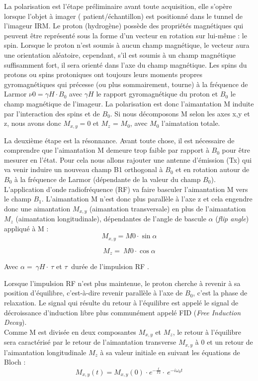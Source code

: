 La polarisation est l’étape préliminaire avant toute acquisition, elle s’opère lorsque l’objet à imager ( patient/échantillon) est positionné dans le tunnel de l’imageur IRM. Le proton (hydrogène) possède des propriétés magnétiques qui peuvent être représenté sous la forme d’un vecteur en rotation sur lui-même : le spin. Lorsque le proton n’est soumis à aucun champ magnétique, le vecteur aura une orientation aléatoire, cependant, s’il est soumis à un champ magnétique suffisamment fort, il sera orienté dans l’axe du champ magnétique. Les spins du protons ou spins protoniques ont toujours leurs moments propres gyromagnétiques qui précesse (ou plus sommairement, tourne) à la fréquence de Larmor $\nu 0 =\gamma H \cdot B_0 $ avec $\gamma H$ le rapport gyromagnétique du proton et $B_0$ le champ magnétique de l’imageur. La polarisation est donc l’aimantation M induite par l’interaction des spins et de $B_0$. Si nous décomposons M selon les axes x,y et z, nous avons donc $M_{x,y} = 0$ et $M_z$ = $M_0$, avec $M_0$ l’aimatation totale.

La deuxième étape est la résonnance. Avant toute chose, il est nécessaire de comprendre que l’aimantation M demeure trop faible  par rapport à $B_0$ pour être mesurer en l’état. Pour cela nous allons rajouter une antenne d’émission (Tx) qui va venir induire un nouveau champ B1 orthogonal à $B_0$ et en rotation autour de $B_0$ à la fréquence de Larmor (dépendante de la valeur du champ $B_0$).  L’application d’onde radiofréquence (RF) va faire basculer l’aimantation M vers le champ $B_1$. L’aimantation M n’est donc plus parallèle à l’axe z et cela engendre donc une aimantation $M_{x,y}$ (aimantation transversale) en plus de l’aimantation $M_z$ (aimantation longitudinale), dépendantes de l’angle de bascule $\alpha$ (\textit{flip angle}) appliqué à M :
\begin{equation}
\nonumber
	M_{x,y} = M0 \cdot \sin{\alpha}
\end{equation}

\begin{equation}
\nonumber
	M_z =\ M0 \cdot \cos{\alpha}
\end{equation}

Avec $\alpha =\ \gamma H\cdot \ \tau$ et $\tau\ $ durée de l’impulsion RF \cite{Ernst1966}.

Lorsque l’impulsion RF n’est plus maintenue, le proton cherche à revenir à sa position d’équilibre, c’est-à-dire revenir parallèle à l’axe de  $B_0$, c’est la phase de relaxation. Le signal qui résulte du retour à l’équilibre est appelé le signal de décroissance d’induction libre plus communément appelé FID (\textit{Free Induction Decay}).
\\
Comme M est divisée en deux composantes $M_{x,y}$  et $M_z$, le retour à l’équilibre sera caractérisé par le retour de l’aimantation transverse $M_{x,y}$  à 0 et un retour de l’aimantation longitudinale $M_z$ à sa valeur initiale en suivant les équations de Bloch \cite{HolgerFrsterling2009}:
\begin{equation}
\nonumber
	M_{x,y}\left(t\right)=M_{x,y}\left(0\right)\ {\cdot\ e}^{-\frac{t}{T2}}\cdot\ e^{-i\omega_0t}
	\end{equation}

